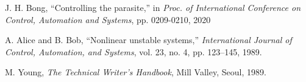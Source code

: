 \documentclass[10pt,twocolumn]{ICCAS}
\begin{document}
%
\begin{thebibliography}{99}

J. H. Bong, ``Controlling the parasite,'' in \textit{Proc. of International Conference on Control, Automation and Systems}, pp. 0209-0210, 2020


A. Alice and B. Bob, ``Nonlinear unstable systems,'' \textit{International Journal of Control, Automation, and Systems}, vol. 23, no. 4, pp. 123–145, 1989.

M. Young, \textit{The Technical Writer's Handbook}, Mill Valley, Seoul, 1989.



\end{thebibliography}
%
\end{document}
